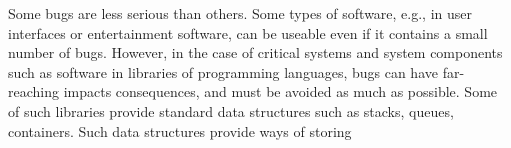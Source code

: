 Some bugs are less serious than others. %
Some types of software, e.g., in user interfaces or entertainment software, can be useable even if it contains a small number of bugs.
However, in the case of critical systems and system components
%
such as software in libraries of programming languages, 
bugs can have far-reaching impacts consequences, and must be avoided as much as possible.
Some of such libraries provide standard data structures such as stacks, queues, containers. Such data structures provide ways of storing  
